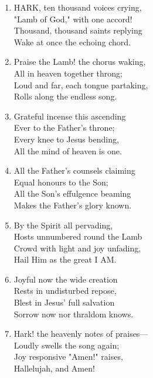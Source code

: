 \begin{enumerate}
    \item HARK, ten thousand voices crying, \\
        "Lamb of God," with one accord! \\
        Thousand, thousand saints replying \\
        Wake at once the echoing chord.

    \item Praise the Lamb! the chorus waking, \\
        All in heaven together throng; \\
        Loud and far, each tongue partaking, \\
        Rolls along the endless song.

    \item Grateful incense this ascending \\
        Ever to the Father's throne; \\
        Every knee to Jesus bending, \\
        All the mind of heaven is one.

    \item All the Father's counsels claiming \\
        Equal honours to the Son; \\
        All the Son's effulgence beaming \\
        Makes the Father's glory known.

    \item By the Spirit all pervading, \\
        Hosts unnumbered round the Lamb \\
        Crowd with light and joy unfading, \\
        Hail Him as the great I AM.

    \item Joyful now the wide creation \\
        Rests in undisturbed repose, \\
        Blest in Jesus' full salvation \\
        Sorrow now nor thraldom knows.

    \item Hark! the heavenly notes of praises--- \\
        Loudly swells the song again; \\
        Joy responsive "Amen!" raises, \\
        Hallelujah, and Amen!

\end{enumerate}

